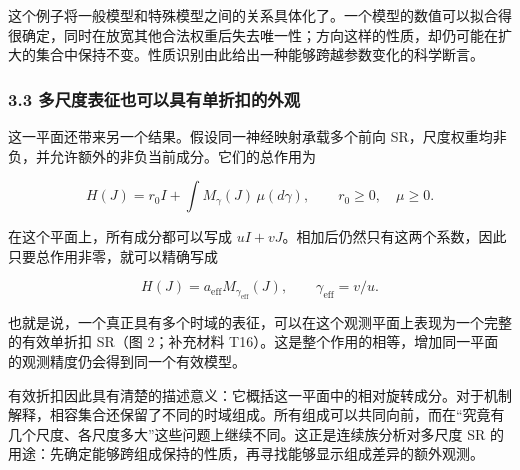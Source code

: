 \documentclass[11pt,a4paper]{article}
\begin{document}
这个例子将一般模型和特殊模型之间的关系具体化了。一个模型的数值可以拟合得很确定，同时在放宽其他合法权重后失去唯一性；方向这样的性质，却仍可能在扩大的集合中保持不变。性质识别由此给出一种能够跨越参数变化的科学断言。

\subsubsection{3.3
多尺度表征也可以具有单折扣的外观}\label{ux591aux5c3aux5ea6ux8868ux5f81ux4e5fux53efux4ee5ux5177ux6709ux5355ux6298ux6263ux7684ux5916ux89c2}

\par
\noindent\begin{minipage}{\linewidth}

这一平面还带来另一个结果。假设同一神经映射承载多个前向
SR，尺度权重均非负，并允许额外的非负当前成分。它们的总作用为

\[
H(J)=r_0I+\int M_\gamma(J)\,\mu(d\gamma),
\qquad r_0\geq0,\quad\mu\geq0.
\]

\end{minipage}\par

\par
\noindent\begin{minipage}{\linewidth}

在这个平面上，所有成分都可以写成
\(uI+vJ\)。相加后仍然只有这两个系数，因此只要总作用非零，就可以精确写成

\[
H(J)=a_{\mathrm{eff}}M_{\gamma_{\mathrm{eff}}}(J),
\qquad \gamma_{\mathrm{eff}}=v/u.
\]

\end{minipage}\par

也就是说，一个真正具有多个时域的表征，可以在这个观测平面上表现为一个完整的有效单折扣
SR（图 2；补充材料
T16）。这是整个作用的相等，增加同一平面的观测精度仍会得到同一个有效模型。

有效折扣因此具有清楚的描述意义：它概括这一平面中的相对旋转成分。对于机制解释，相容集合还保留了不同的时域组成。所有组成可以共同向前，而在“究竟有几个尺度、各尺度多大”这些问题上继续不同。这正是连续族分析对多尺度
SR
的用途：先确定能够跨组成保持的性质，再寻找能够显示组成差异的额外观测。
\end{document}
